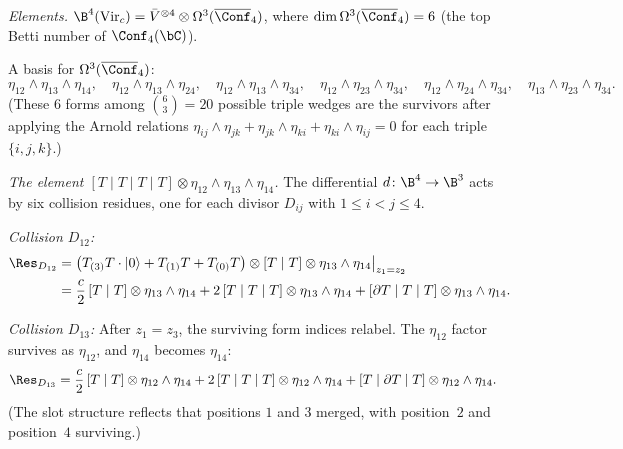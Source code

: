 \begin{computation}
\label{comp:virasoro-deg4-full}

\emph{Elements.}
$\B^4(\mathrm{Vir}_c) = \bar{V}^{\otimes 4}
\otimes \Omega^3(\overline{\Conf}_4)$, where
$\dim \Omega^3(\overline{\Conf}_4) = 6$
(the top Betti number of $\Conf_4(\bC)$).

A basis for $\Omega^3(\overline{\Conf}_4)$:
\begin{equation}\label{eq:form-basis-4}
\eta_{12} \wedge \eta_{13} \wedge \eta_{14}, \quad
\eta_{12} \wedge \eta_{13} \wedge \eta_{24}, \quad
\eta_{12} \wedge \eta_{13} \wedge \eta_{34}, \quad
\eta_{12} \wedge \eta_{23} \wedge \eta_{34}, \quad
\eta_{12} \wedge \eta_{24} \wedge \eta_{34}, \quad
\eta_{13} \wedge \eta_{23} \wedge \eta_{34}.
\end{equation}
(These $6$ forms among $\binom{6}{3} = 20$ possible triple wedges
are the survivors after applying the Arnold relations
$\eta_{ij} \wedge \eta_{jk} + \eta_{jk} \wedge \eta_{ki}
+ \eta_{ki} \wedge \eta_{ij} = 0$ for each triple $\{i,j,k\}$.)

\emph{The element $[T\mid T\mid T\mid T]
\otimes \eta_{12} \wedge \eta_{13} \wedge \eta_{14}$.}
The differential $d\colon \B^4 \to \B^3$ acts by six collision
residues, one for each divisor $D_{ij}$ with $1 \leq i < j \leq 4$.

\emph{Collision $D_{12}$:}
\begin{align*}
\Res_{D_{12}} &= \bigl(T_{(3)}T \cdot |0\rangle + T_{(1)}T
 + T_{(0)}T\bigr) \otimes [T \mid T]
 \otimes \eta_{13} \wedge \eta_{14}\big|_{z_1 = z_2} \\
&= \frac{c}{2}\,[T \mid T] \otimes \eta_{13} \wedge \eta_{14}
 + 2\,[T \mid T \mid T] \otimes \eta_{13} \wedge \eta_{14}
 + [\partial T \mid T \mid T] \otimes \eta_{13} \wedge \eta_{14}.
\end{align*}

\emph{Collision $D_{13}$:}
After $z_1 = z_3$, the surviving form indices relabel.
The $\eta_{12}$ factor survives as $\eta_{12}$, and $\eta_{14}$
becomes $\eta_{14}$:
\begin{align*}
\Res_{D_{13}} &= \frac{c}{2}\,[T \mid T] \otimes \eta_{12} \wedge \eta_{14}
 + 2\,[T \mid T \mid T] \otimes \eta_{12} \wedge \eta_{14}
 + [T \mid \partial T \mid T] \otimes \eta_{12} \wedge \eta_{14}.
\end{align*}
(The slot structure reflects that positions $1$ and $3$ merged,
with position~$2$ and position~$4$ surviving.)


\end{computation}
